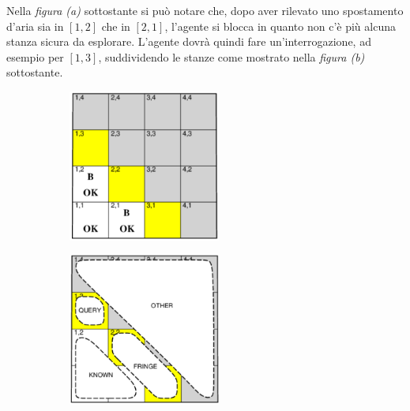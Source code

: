 \documentclass[11pt,oneside]{book}
\begin{document}
Nella \textit{figura (a)} sottostante si può notare che, dopo aver rilevato uno spostamento d'aria sia in $[1,2]$ che in $[2,1]$, l'agente si blocca in quanto non c'è più alcuna stanza sicura da esplorare. L'agente dovrà quindi fare un'interrogazione, ad esempio per $[1,3]$, suddividendo le stanze come mostrato nella \textit{figura (b)} sottostante.
\begin{figure}[htp]
	\begin{subfigure}{0.49\textwidth}
	    \centering
		\includegraphics[width=0.55\textwidth]{wumpus-exploration1.png}
		\caption{}
	\end{subfigure}
	\hfill
	\begin{subfigure}{0.49\textwidth}
	    \centering
		\includegraphics[width=0.55\textwidth]{wumpus-exploration2.png}
		\caption{}
	\end{subfigure}
\end{figure}
\end{document}
